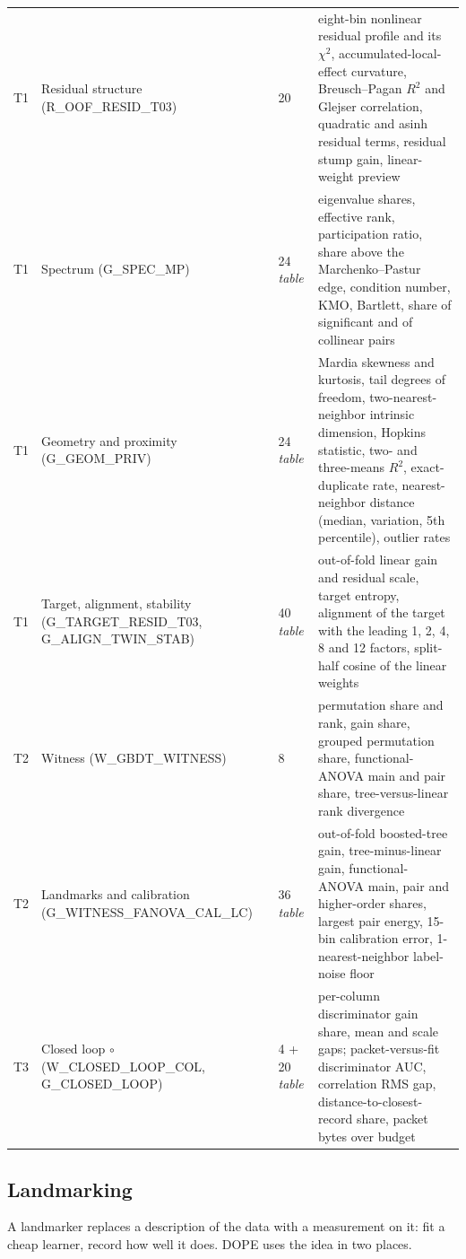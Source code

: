 \documentclass[10pt,letterpaper,twocolumn]{article}
\newcommand{\tcli}[1]{{\ttfamily\fontsize{7.4}{9.4}\selectfont #1}}
\begin{document}
\begin{table}[t]
\begin{tabularx}{\textwidth}{@{}L{0.55cm}L{3.9cm}R{1.05cm}Y@{}}
T1 & Residual structure (\tcli{R\_OOF\_RESID\_T03}) & 20 & eight-bin nonlinear residual profile and its $\chi^2$, accumulated-local-effect curvature, Breusch--Pagan $R^2$ and Glejser correlation, quadratic and asinh residual terms, residual stump gain, linear-weight preview\\
T1 & Spectrum (\tcli{G\_SPEC\_MP}) & 24 \emph{table} & eigenvalue shares, effective rank, participation ratio, share above the Marchenko--Pastur edge, condition number, KMO, Bartlett, share of significant and of collinear pairs\\
T1 & Geometry and proximity (\tcli{G\_GEOM\_PRIV}) & 24 \emph{table} & Mardia skewness and kurtosis, tail degrees of freedom, two-nearest-neighbor intrinsic dimension, Hopkins statistic, two- and three-means $R^2$, exact-duplicate rate, nearest-neighbor distance (median, variation, 5th percentile), outlier rates\\
T1 & Target, alignment, stability (\tcli{G\_TARGET\_RESID\_T03}, \tcli{G\_ALIGN\_TWIN\_STAB}) & 40 \emph{table} & out-of-fold linear gain and residual scale, target entropy, alignment of the target with the leading 1, 2, 4, 8 and 12 factors, split-half cosine of the linear weights\\
\midrule
T2 & Witness (\tcli{W\_GBDT\_WITNESS}) & 8 & permutation share and rank, gain share, grouped permutation share, functional-ANOVA main and pair share, tree-versus-linear rank divergence\\
T2 & Landmarks and calibration (\tcli{G\_WITNESS\_FANOVA\_CAL\_LC}) & 36 \emph{table} & out-of-fold boosted-tree gain, tree-minus-linear gain, functional-ANOVA main, pair and higher-order shares, largest pair energy, 15-bin calibration error, 1-nearest-neighbor label-noise floor\\
\midrule
T3 & Closed loop $\circ$ (\tcli{W\_CLOSED\_LOOP\_COL}, \tcli{G\_CLOSED\_LOOP}) & 4 + 20 \emph{table} & per-column discriminator gain share, mean and scale gaps; packet-versus-fit discriminator AUC, correlation RMS gap, distance-to-closest-record share, packet bytes over budget\\
\bottomrule
\end{tabularx}
\end{table}

\subsection{Landmarking}\label{sec:landmark}
A landmarker replaces a description of the data with a measurement on it: fit a cheap learner, record how well it does. DOPE uses the idea in two places.
\end{document}
